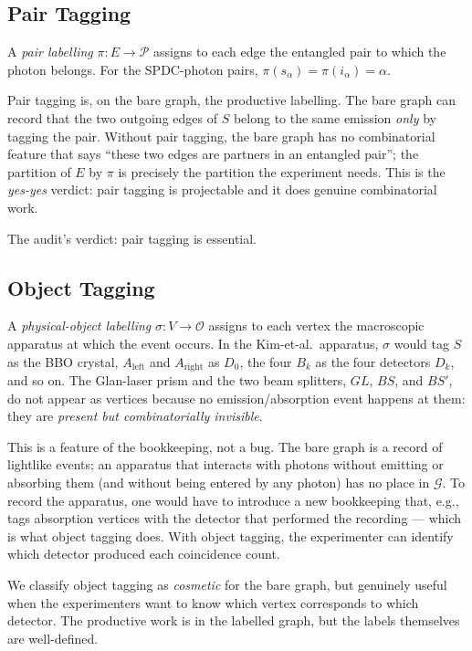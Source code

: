 \documentclass[11pt]{article}
\begin{document}
\subsection{Pair Tagging}

A \emph{pair labelling} $\pi : E \to \mathcal{P}$ assigns to each edge the entangled pair to which the photon belongs. For the SPDC-photon pairs, $\pi(s_\alpha) = \pi(i_\alpha) = \alpha$.

Pair tagging is, on the bare graph, the productive labelling. The bare graph can record that the two outgoing edges of $S$ belong to the same emission \emph{only} by tagging the pair. Without pair tagging, the bare graph has no combinatorial feature that says ``these two edges are partners in an entangled pair''; the partition of $E$ by $\pi$ is precisely the partition the experiment needs. This is the \emph{yes-yes} verdict: pair tagging is projectable and it does genuine combinatorial work.

The audit's verdict: pair tagging is essential.

\subsection{Object Tagging}

A \emph{physical-object labelling} $\sigma : V \to \mathcal{O}$ assigns to each vertex the macroscopic apparatus at which the event occurs. In the Kim-et-al.~apparatus, $\sigma$ would tag $S$ as the BBO crystal, $A_{\text{left}}$ and $A_{\text{right}}$ as $D_0$, the four $B_k$ as the four detectors $D_k$, and so on. The Glan-laser prism and the two beam splitters, $GL$, $BS$, and $BS'$, do not appear as vertices because no emission/absorption event happens at them: they are \emph{present but combinatorially invisible}.

This is a feature of the bookkeeping, not a bug. The bare graph is a record of lightlike events; an apparatus that interacts with photons without emitting or absorbing them (and without being entered by any photon) has no place in $\mathcal{G}$. To record the apparatus, one would have to introduce a new bookkeeping that, e.g., tags absorption vertices with the detector that performed the recording --- which is what object tagging does. With object tagging, the experimenter can identify which detector produced each coincidence count.

We classify object tagging as \emph{cosmetic} for the bare graph, but genuinely useful when the experimenters want to know which vertex corresponds to which detector. The productive work is in the labelled graph, but the labels themselves are well-defined.
\end{document}
